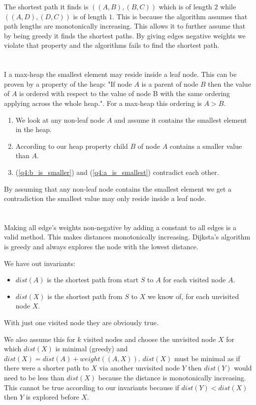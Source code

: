 \documentclass[12pt]{article}
\begin{document}
The shortest path it finds is $((A, B), (B, C))$ which is of length $2$ while $((A, D), (D, C))$ is of length $1$. This is because the algorithm assumes that path lengths are monotonically increasing. This allows it to further assume that by being greedy it finds the shortest paths. By giving edges negative weights we violate that property and the algorithms fails to find the shortest path.

\section{} %
I a max-heap the smallest element may reside inside a leaf node. This can be proven by a property of the heap: "If node $A$ is a parent of node $B$ then the value of $A$ is ordered with respect to the value of node B with the same ordering applying across the whole heap.". For a max-heap this ordering is $A > B$.

\begin{enumerate}
	\item \label{q4:a_is_smallest}
	We look at any non-leaf node $A$ and assume it contains the smallest element in the heap.
	\item \label{q4:b_is_smaller}
	According to our heap property child $B$ of node $A$ contains a smaller value than $A$.
	\item
	(\ref{q4:b_is_smaller}) and (\ref{q4:a_is_smallest}) contradict each other.
\end{enumerate}

By assuming that any non-leaf node contains the smallest element we get a contradiction the smallest value may only reside inside a leaf node.

\section{} %
\section{} %
Making all edge's weights non-negative by adding a constant to all edges is a valid method. This makes distances monotonically increasing. Dijksta's algorithm is greedy and always explores the node with the lowest distance.

We have out invariants:
\begin{itemize}
	\item $dist(A)$ is the shortest path from start $S$ to $A$ for each visited node $A$.
	\item $dist(X)$ is the shortest path from $S$ to $X$ we know of, for each unvisited node $X$.
\end{itemize}

With just one visited node they are obviously true.

We also assume this for $k$ visited nodes and choose the unvisited node $X$ for which $dist(X)$ is minimal (greedy) and $dist(X) = dist(A) + weight((A, X))$. $dist(X)$ must be minimal as if there were a shorter path to $X$ via another unvisited node $Y$ then $dist(Y)$ would need to be less than $dist(X)$ because the distance is monotonically increasing. This cannot be true according to our invariants because if $dist(Y) < dist(X)$ then $Y$ is explored before $X$.
\end{document}
